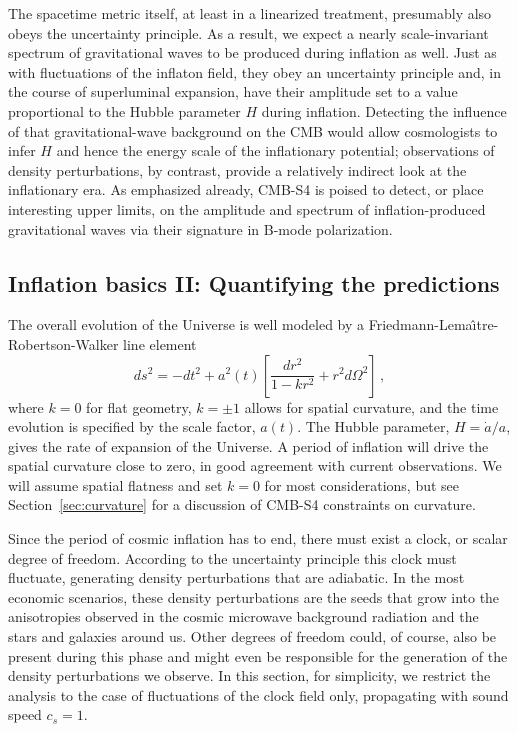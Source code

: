 The spacetime metric itself, at least in a linearized treatment, presumably also obeys the uncertainty principle. As a result, we expect a nearly scale-invariant spectrum of gravitational waves to be produced during inflation as well. Just as with fluctuations of the inflaton field, they obey an uncertainty principle and, in the course of superluminal expansion, have their amplitude set to a value proportional to the Hubble parameter $H$ during inflation. Detecting the influence of that gravitational-wave background on the CMB would allow cosmologists to infer $H$ and hence the energy scale of the inflationary potential; observations of density perturbations, by contrast, provide a relatively indirect look at the inflationary era. As emphasized already, CMB-S4 is poised to detect, or place interesting upper limits, on the amplitude and spectrum of inflation-produced gravitational waves via their signature in B-mode polarization. 


\subsection{Inflation basics II: Quantifying the predictions}

The overall evolution of the Universe is well modeled by a Friedmann-Lema\^{\i}tre-Robertson-Walker line element
\begin{equation}
ds^2=-dt^2+a^2(t)\left[\frac{dr^2}{1-kr^2}+r^2d\Omega^2\right]\,,
\end{equation}
where $k=0$ for flat geometry, $k=\pm1$ allows for spatial curvature, and the time evolution is specified by the scale factor, $a(t)$. The Hubble parameter, $H=\dot{a}/a$, gives the rate of expansion of the Universe. A period of inflation will drive the spatial curvature close to zero, in good agreement with current observations. We will assume spatial flatness and set $k=0$ for most considerations, but see Section~\ref{sec:curvature} for a discussion of CMB-S4 constraints on curvature. 

Since the period of cosmic inflation has to end, there must exist a clock, or scalar degree of freedom. According to the uncertainty principle this clock must fluctuate, generating density perturbations that are adiabatic. In the most economic scenarios, these density perturbations are the seeds that grow into the anisotropies observed in the cosmic microwave background radiation and the stars and galaxies around us. Other degrees of freedom could, of course, also be present during this phase and might even be responsible for the generation of the density perturbations we observe. In this section, for simplicity, we restrict the analysis to the case of fluctuations of the clock field only, propagating with sound speed $c_s=1$.

